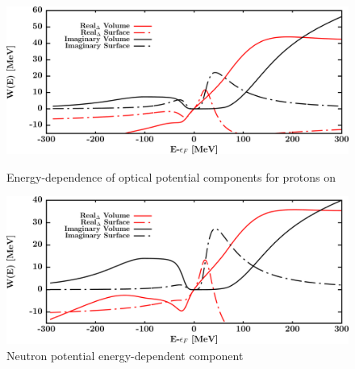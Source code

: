 \begin{figure}[H]
    \centering
    \begin{minipage}{0.45\textwidth}
        \centering
        \includegraphics[width=1.0\textwidth]{figures/ca48_protonPotentials.png}
        \caption{Energy-dependence of optical potential components for protons
        on \caEight}
        \label{DOMFitData_ca48_proton_potentialComponent_energy}
    \end{minipage}\hfill
    \begin{minipage}{0.45\textwidth}
        \centering
        \includegraphics[width=1.0\textwidth]{figures/ca48_neutronPotentials.png}
        \caption{Neutron potential energy-dependent component}
        \label{DOMFitData_ca48_neutron_potentialComponent_energy}
    \end{minipage}
\end{figure}

